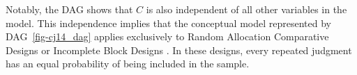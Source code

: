 \documentclass[
  authoryear,
  review,
  1p]{elsarticle}
\begin{document}
Notably, the DAG shows that \(C\) is also independent of all other
variables in the model. This independence implies that the conceptual
model represented by DAG~\ref{fig-cj14_dag} applies exclusively to
Random Allocation Comparative Designs \citep[pp.~8]{Bramley_2015} or
Incomplete Block Designs \citep[pp.~259-271]{Lawson_2015}. In these
designs, every repeated judgment has an equal probability of being
included in the sample.

\begin{figure}[H]

\begin{minipage}{\linewidth}

\centering{

\[
\begin{aligned}
  O_{R} & := f_{C}(O^{sc}_{R}, C) \\
  O^{sc}_{R} & := f_{S}(O^{cp}_{R}, S) \\
  O^{cp}_{R} & := f_{O}(D_{R}) \\
  D_{R} & := f_{D}(T_{IA}, B_{JK}) \\
  T_{IA} & := f_{T}(T_{I}, X_{IA}, e_{IA}) \\
  T_{I} & := f_{T}(X_{I}, e_{I}) \\
  B_{JK} & := f_{B}(B_{J}, Z_{JK}, e_{JK}) \\
  B_{J} & := f_{B}(Z_{J}, e_{J}) \\
  e_{I} & \:\bot\:\{ e_{J}, e_{IA}, e_{JK} \} \\
  e_{J} & \:\bot\:\{ e_{IA}, e_{JK} \} \\
  e_{IA} & \:\bot\:e_{JK} 
\end{aligned}
\]

}


\end{minipage}%
\newline
\begin{minipage}{\linewidth}

\end{minipage}
\end{figure}
\end{document}
